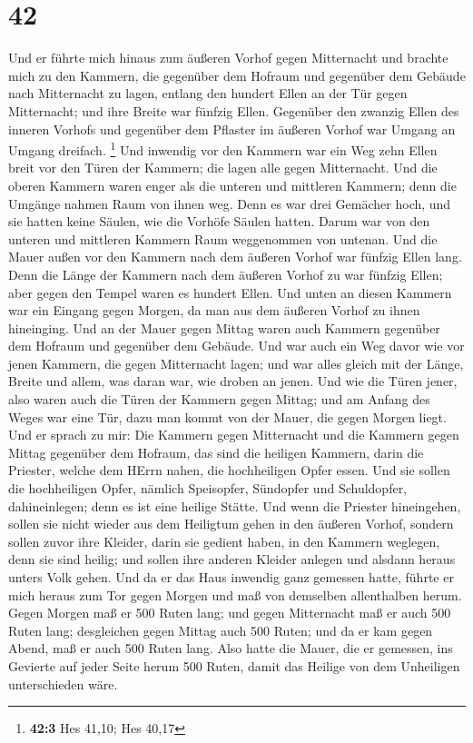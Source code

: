 \hypertarget{section-41}{%
\section{42}\label{section-41}}

 Und er führte mich hinaus zum äußeren Vorhof gegen
Mitternacht und brachte mich zu den Kammern, die gegenüber dem Hofraum
und gegenüber dem Gebäude nach Mitternacht zu lagen, 
entlang den hundert Ellen an der Tür gegen Mitternacht; und ihre Breite
war fünfzig Ellen.  Gegenüber den zwanzig Ellen des
inneren Vorhofs und gegenüber dem Pflaster im äußeren Vorhof war Umgang
an Umgang dreifach. \footnote{\textbf{42:3} Hes 41,10; Hes 40,17}
 Und inwendig vor den Kammern war ein Weg zehn Ellen breit
vor den Türen der Kammern; die lagen alle gegen Mitternacht.
 Und die oberen Kammern waren enger als die unteren und
mittleren Kammern; denn die Umgänge nahmen Raum von ihnen weg.
 Denn es war drei Gemächer hoch, und sie hatten keine
Säulen, wie die Vorhöfe Säulen hatten. Darum war von den unteren und
mittleren Kammern Raum weggenommen von untenan.  Und die
Mauer außen vor den Kammern nach dem äußeren Vorhof war fünfzig Ellen
lang.  Denn die Länge der Kammern nach dem äußeren Vorhof
zu war fünfzig Ellen; aber gegen den Tempel waren es hundert Ellen.
 Und unten an diesen Kammern war ein Eingang gegen Morgen,
da man aus dem äußeren Vorhof zu ihnen hineinging.  Und
an der Mauer gegen Mittag waren auch Kammern gegenüber dem Hofraum und
gegenüber dem Gebäude.  Und war auch ein Weg davor wie
vor jenen Kammern, die gegen Mitternacht lagen; und war alles gleich mit
der Länge, Breite und allem, was daran war, wie droben an jenen.
 Und wie die Türen jener, also waren auch die Türen der
Kammern gegen Mittag; und am Anfang des Weges war eine Tür, dazu man
kommt von der Mauer, die gegen Morgen liegt.  Und er
sprach zu mir: Die Kammern gegen Mitternacht und die Kammern gegen
Mittag gegenüber dem Hofraum, das sind die heiligen Kammern, darin die
Priester, welche dem HErrn nahen, die hochheiligen Opfer essen. Und sie
sollen die hochheiligen Opfer, nämlich Speisopfer, Sündopfer und
Schuldopfer, dahineinlegen; denn es ist eine heilige Stätte.
 Und wenn die Priester hineingehen, sollen sie nicht
wieder aus dem Heiligtum gehen in den äußeren Vorhof, sondern sollen
zuvor ihre Kleider, darin sie gedient haben, in den Kammern weglegen,
denn sie sind heilig; und sollen ihre anderen Kleider anlegen und
alsdann heraus unters Volk gehen.  Und da er das Haus
inwendig ganz gemessen hatte, führte er mich heraus zum Tor gegen Morgen
und maß von demselben allenthalben herum.  Gegen Morgen
maß er 500 Ruten lang;  und gegen Mitternacht maß er auch
500 Ruten lang;  desgleichen gegen Mittag auch 500 Ruten;
 und da er kam gegen Abend, maß er auch 500 Ruten lang.
 Also hatte die Mauer, die er gemessen, ins Gevierte auf
jeder Seite herum 500 Ruten, damit das Heilige von dem Unheiligen
unterschieden wäre.

